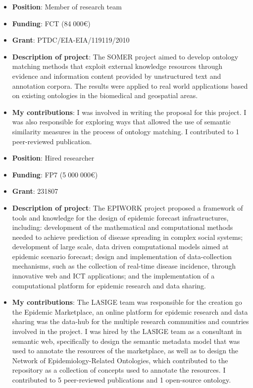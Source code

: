 \begin{itemize}
    \item \textbf{Position}: Member of research team
    \item \textbf{Funding}: FCT (84$\;$000€)
    \item \textbf{Grant}: PTDC/EIA-EIA/119119/2010
    \item \textbf{Description of project}: The SOMER project aimed to develop ontology matching methods that exploit external knowledge resources through evidence and information content provided by unstructured text and annotation corpora. The results were applied to real world applications based on existing ontologies in the biomedical and geospatial areas.
    \item \textbf{My contributions}: I was involved in writing the proposal for this project. I was also responsible for exploring ways that allowed the use of semantic similarity measures in the process of ontology matching. I contributed to 1 peer-reviewed publication.
\end{itemize}

\begin{itemize}
    \item \textbf{Position}: Hired researcher
    \item \textbf{Funding}: FP7 (5$\;$000$\;$000€)
    \item \textbf{Grant}: 231807
    \item \textbf{Description of project}: The EPIWORK project proposed a framework of tools and knowledge for the design of epidemic forecast infrastructures, including: development of the mathematical and computational methods needed to achieve prediction of disease spreading in complex social systems; development of large scale, data driven computational models aimed at epidemic scenario forecast; design and implementation of data-collection mechanisms, such as the collection of real-time disease incidence, through innovative web and ICT applications; and the implementation of a computational platform for epidemic research and data sharing.
    \item \textbf{My contributions}: The LASIGE team was responsible for the creation go the Epidemic Marketplace, an online platform for epidemic research and data sharing was the data-hub for the multiple research communities and countries involved in the project. I was hired by the LASIGE team as a consultant in semantic web, specifically to design the semantic metadata model that was used to annotate the resources of the marketplace, as well as to design the Network of Epidemiology-Related Ontologies, which contributed to the repository as a collection of concepts used to annotate the resources. I contributed to 5 peer-reviewed publications and 1 open-source ontology.
\end{itemize}

